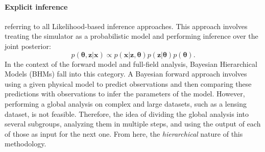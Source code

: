 \documentclass{aa}
\begin{document}
\paragraph{\textbf{Explicit inference}} referring to all Likelihood-based inference approaches.  
This approach involves treating the simulator as a probabilistic model and performing inference over the joint posterior:
\begin{equation}
        p(\bm{\theta},\bm{z}|\bm{x})\propto  p(\bm{x}|\bm{z},\bm{\theta}) p(\bm{z}|\bm{\theta})p(\bm{\theta}).
\end{equation}
In the context of the forward model and full-field analysis, Bayesian Hierarchical Models (BHMs) fall into this category.
A Bayesian forward approach involves using a given physical model to predict observations and then comparing these predictions with observations to infer the parameters of the model.
However, performing a global analysis on complex and large datasets, such as a lensing dataset, is not feasible. Therefore, the idea of dividing the global analysis into several subgroups, analyzing them in multiple steps, and using the output of each of those as input for the next one. From here, the \textit{hierarchical} nature of this methodology.
\end{document}

